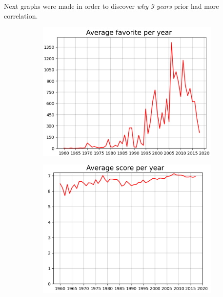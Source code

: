 \begin{frame}
Next graphs were made in order to discover \emph{why} \textit{9 years} prior had more correlation. 
\vspace{-5pt}
\begin{figure}
	\centering
	\begin{subfigure}{.45\columnwidth}
		\centering
		\includegraphics[width=\columnwidth]{graphics/avgFavorites.png}
	\end{subfigure}%
	\begin{subfigure}{.45\columnwidth}
		\centering
		\includegraphics[width=\columnwidth]{graphics/avgScores.png}
	\end{subfigure}
	\begin{subfigure}{.45\columnwidth}

\end{subfigure}
\end{figure}
\end{frame}

